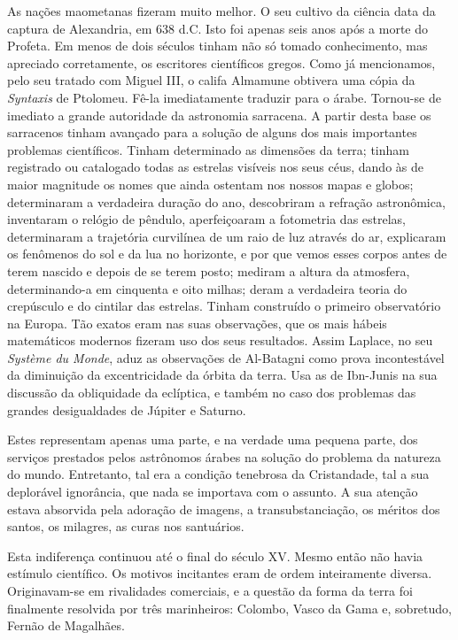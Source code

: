 \documentclass[11pt,a5paper,twoside,openany]{book}
\begin{document}
As nações maometanas fizeram muito melhor. O seu cultivo da ciência data da captura de Alexandria, em 638 d.C. Isto foi apenas seis anos após a morte do Profeta. Em menos de dois séculos tinham não só tomado conhecimento, mas apreciado corretamente, os escritores científicos gregos. Como já mencionamos, pelo seu tratado com Miguel III, o califa Almamune obtivera uma cópia da \textit{Syntaxis} de Ptolomeu. Fê-la imediatamente traduzir para o árabe. Tornou-se de imediato a grande autoridade da astronomia sarracena. A partir desta base os sarracenos tinham avançado para a solução de alguns dos mais importantes problemas científicos. Tinham determinado as dimensões da terra; tinham registrado ou catalogado todas as estrelas visíveis nos seus céus, dando às de maior magnitude os nomes que ainda ostentam nos nossos mapas e globos; determinaram a verdadeira duração do ano, descobriram a refração astronômica, inventaram o relógio de pêndulo, aperfeiçoaram a fotometria das estrelas, determinaram a trajetória curvilínea de um raio de luz através do ar, explicaram os fenômenos do sol e da lua no horizonte, e por que vemos esses corpos antes de terem nascido e depois de se terem posto; mediram a altura da atmosfera, determinando-a em cinquenta e oito milhas; deram a verdadeira teoria do crepúsculo e do cintilar das estrelas. Tinham construído o primeiro observatório na Europa. Tão exatos eram nas suas observações, que os mais hábeis matemáticos modernos fizeram uso dos seus resultados. Assim Laplace, no seu \textit{Système du Monde}, aduz as observações de Al-Batagni como prova incontestável da diminuição da excentricidade da órbita da terra. Usa as de Ibn-Junis na sua discussão da obliquidade da eclíptica, e também no caso dos problemas das grandes desigualdades de Júpiter e Saturno.

Estes representam apenas uma parte, e na verdade uma pequena parte, dos serviços prestados pelos astrônomos árabes na solução do problema da natureza do mundo. Entretanto, tal era a condição tenebrosa da Cristandade, tal a sua deplorável ignorância, que nada se importava com o assunto. A sua atenção estava absorvida pela adoração de imagens, a transubstanciação, os méritos dos santos, os milagres, as curas nos santuários.

Esta indiferença continuou até o final do século XV. Mesmo então não havia estímulo científico. Os motivos incitantes eram de ordem inteiramente diversa. Originavam-se em rivalidades comerciais, e a questão da forma da terra foi finalmente resolvida por três marinheiros: Colombo, Vasco da Gama e, sobretudo, Fernão de Magalhães.
\end{document}
